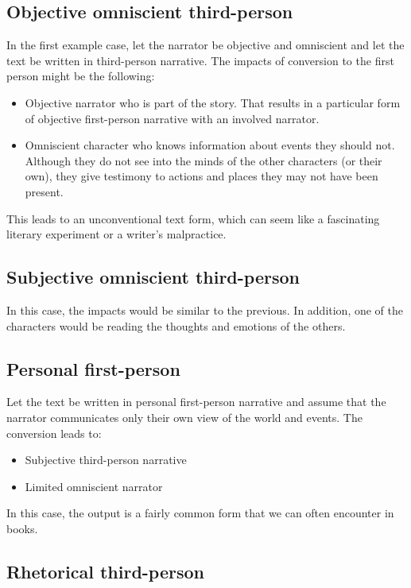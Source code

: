 \subsection*{Objective omniscient third-person}

In the first example case, let the narrator be objective and omniscient and let the text be written in third-person narrative. The impacts of conversion to the first person might be the following:

\begin{itemize}
	\item Objective narrator who is part of the story. That results in a particular form of objective first-person narrative with an involved narrator.
	\item Omniscient character who knows information about events they should not. Although they do not see into the minds of the other characters (or their own), they give testimony to actions and places they may not have been present.
\end{itemize}

This leads to an unconventional text form, which can seem like a fascinating literary experiment or a writer's malpractice.

\subsection*{Subjective omniscient third-person}

In this case, the impacts would be similar to the previous. In addition, one of the characters would be reading the thoughts and emotions of the others.

\subsection*{Personal first-person}

Let the text be written in personal first-person narrative and assume that the narrator communicates only their own view of the world and events. The conversion leads to:

\begin{itemize}
	\item Subjective third-person narrative
	\item Limited omniscient narrator
\end{itemize}

In this case, the output is a fairly common form that we can often encounter in books.

\subsection*{Rhetorical third-person}

